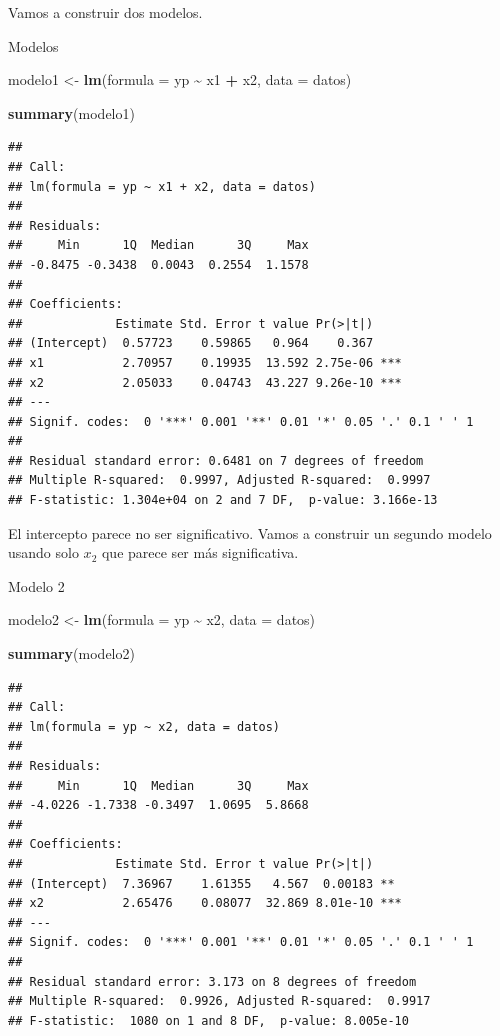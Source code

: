 \documentclass[
]{book}
\newenvironment{Shaded}{\begin{snugshade}}{\end{snugshade}}
\newcommand{\AttributeTok}[1]{\textcolor[rgb]{0.13,0.29,0.53}{#1}}
\newcommand{\FunctionTok}[1]{\textcolor[rgb]{0.13,0.29,0.53}{\textbf{#1}}}
\newcommand{\NormalTok}[1]{#1}
\newcommand{\OtherTok}[1]{\textcolor[rgb]{0.56,0.35,0.01}{#1}}
\newcommand{\SpecialCharTok}[1]{\textcolor[rgb]{0.81,0.36,0.00}{\textbf{#1}}}
\begin{document}
Vamos a construir dos modelos.

Modelos

\begin{Shaded}
\begin{Highlighting}[]
\NormalTok{modelo1 }\OtherTok{\textless{}{-}} \FunctionTok{lm}\NormalTok{(}\AttributeTok{formula =}\NormalTok{ yp }\SpecialCharTok{\textasciitilde{}}\NormalTok{ x1 }\SpecialCharTok{+}\NormalTok{ x2, }\AttributeTok{data =}\NormalTok{ datos)}

\FunctionTok{summary}\NormalTok{(modelo1)}
\end{Highlighting}
\end{Shaded}

\begin{verbatim}
## 
## Call:
## lm(formula = yp ~ x1 + x2, data = datos)
## 
## Residuals:
##     Min      1Q  Median      3Q     Max 
## -0.8475 -0.3438  0.0043  0.2554  1.1578 
## 
## Coefficients:
##             Estimate Std. Error t value Pr(>|t|)    
## (Intercept)  0.57723    0.59865   0.964    0.367    
## x1           2.70957    0.19935  13.592 2.75e-06 ***
## x2           2.05033    0.04743  43.227 9.26e-10 ***
## ---
## Signif. codes:  0 '***' 0.001 '**' 0.01 '*' 0.05 '.' 0.1 ' ' 1
## 
## Residual standard error: 0.6481 on 7 degrees of freedom
## Multiple R-squared:  0.9997, Adjusted R-squared:  0.9997 
## F-statistic: 1.304e+04 on 2 and 7 DF,  p-value: 3.166e-13
\end{verbatim}

El intercepto parece no ser significativo. Vamos a construir un segundo modelo usando solo \(x_2\) que parece ser más significativa.

Modelo 2

\begin{Shaded}
\begin{Highlighting}[]
\NormalTok{modelo2 }\OtherTok{\textless{}{-}} \FunctionTok{lm}\NormalTok{(}\AttributeTok{formula =}\NormalTok{ yp }\SpecialCharTok{\textasciitilde{}}\NormalTok{ x2, }\AttributeTok{data =}\NormalTok{ datos)}

\FunctionTok{summary}\NormalTok{(modelo2)}
\end{Highlighting}
\end{Shaded}

\begin{verbatim}
## 
## Call:
## lm(formula = yp ~ x2, data = datos)
## 
## Residuals:
##     Min      1Q  Median      3Q     Max 
## -4.0226 -1.7338 -0.3497  1.0695  5.8668 
## 
## Coefficients:
##             Estimate Std. Error t value Pr(>|t|)    
## (Intercept)  7.36967    1.61355   4.567  0.00183 ** 
## x2           2.65476    0.08077  32.869 8.01e-10 ***
## ---
## Signif. codes:  0 '***' 0.001 '**' 0.01 '*' 0.05 '.' 0.1 ' ' 1
## 
## Residual standard error: 3.173 on 8 degrees of freedom
## Multiple R-squared:  0.9926, Adjusted R-squared:  0.9917 
## F-statistic:  1080 on 1 and 8 DF,  p-value: 8.005e-10
\end{verbatim}
\end{document}
